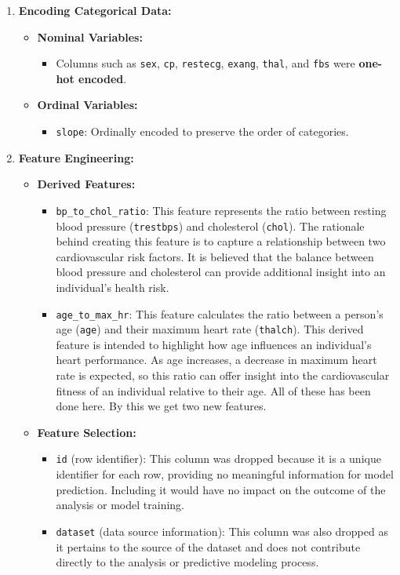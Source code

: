 \documentclass[pdflatex,sn-nature,Numbered]{sn-jnl}%
\theoremstyle{thmstyleone}%
\theoremstyle{thmstyletwo}%
\theoremstyle{thmstylethree}%
\begin{document}
\begin{enumerate}
    \item \textbf{Encoding Categorical Data:}
    \begin{itemize}
        \item \textbf{Nominal Variables:}
        \begin{itemize}
            \item Columns such as \texttt{sex}, \texttt{cp}, \texttt{restecg}, \texttt{exang}, \texttt{thal}, and \texttt{fbs} were \textbf{one-hot encoded}.
        \end{itemize}
        \item \textbf{Ordinal Variables:}
        \begin{itemize}
            \item \texttt{slope}: Ordinally encoded to preserve the order of categories.
        \end{itemize}
    \end{itemize}

    \item \textbf{Feature Engineering:}
    \begin{itemize}
        \item \textbf{Derived Features:}
        \begin{itemize}
            \item \texttt{bp\_to\_chol\_ratio}: This feature represents the ratio between resting blood pressure (\texttt{trestbps}) and cholesterol (\texttt{chol}). The rationale behind creating this feature is to capture a relationship between two cardiovascular risk factors. It is believed that the balance between blood pressure and cholesterol can provide additional insight into an individual’s health risk.
            \item \texttt{age\_to\_max\_hr}: This feature calculates the ratio between a person’s age (\texttt{age}) and their maximum heart rate (\texttt{thalch}). This derived feature is intended to highlight how age influences an individual's heart performance. As age increases, a decrease in maximum heart rate is expected, so this ratio can offer insight into the cardiovascular fitness of an individual relative to their age. All of these has been done here. By this we get two new features.
        \end{itemize}
        
        
        \item \textbf{Feature Selection:}
        \begin{itemize}
            \item \texttt{id} (row identifier): This column was dropped because it is a unique identifier for each row, providing no meaningful information for model prediction. Including it would have no impact on the outcome of the analysis or model training.
            \item \texttt{dataset} (data source information): This column was also dropped as it pertains to the source of the dataset and does not contribute directly to the analysis or predictive modeling process.
        \end{itemize}
        

\end{itemize}
\end{enumerate}
\end{document}
